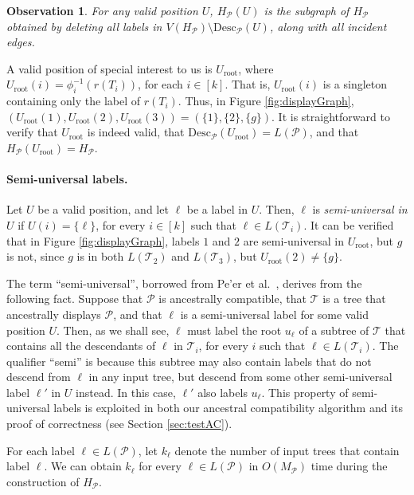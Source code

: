\documentclass[11pt]{article}
\newcommand{\MP}{\ensuremath{M_\P}} \newcommand{\TG}{\ensuremath{\Gamma}} \newcommand{\incompatible}{\texttt{incompatible}}
\newcommand{\Uinit}{\ensuremath{U_\mathrm{root}}} \newcommand{\Ubef}{\ensuremath{U_\mathrm{bef}}} \newcommand{\Uaft}{\ensuremath{U_\mathrm{aft}}} \newcommand{\Urem}{\ensuremath{U_\mathrm{rem}}} \newcommand{\Yinit}{\ensuremath{Y_\mathrm{root}}} \newcommand{\Winit}{\ensuremath{W_\mathrm{root}}} \newcommand{\indeg}{\ensuremath{\mathrm{indegree}}} \newcommand{\Desc}{\ensuremath{\mathrm{Desc}}}
\newcommand{\DG}{\ensuremath{H_\P}} \newcommand{\GBNT}{\ensuremath{G_{\mathtt{BNT}}}}
\renewcommand{\P}{\ensuremath{\mathcal{P}}}
\newcommand{\T}{\ensuremath{\mathcal{T}}}
\newtheorem{observation}{Observation}
\theoremstyle{definition}
\begin{document}
\begin{observation}\label{obs:update1}
For any valid position $U$, $\DG(U)$ is the subgraph of $\DG$ obtained by deleting all labels in $V(\DG) \setminus \Desc_\P(U)$, along with all incident edges.
\end{observation}

A valid position of special interest to us is $\Uinit$, where 
$\Uinit(i) = \phi_i^{-1}(r(T_i))$, for each $i \in [k]$.  That is, $\Uinit(i)$ is a singleton containing only the label of $r(T_i)$.  Thus, in Figure \ref{fig:displayGraph}, $(\Uinit(1), \Uinit(2), \Uinit(3)) = (\{1\}, \{2\}, \{g\})$.
It is straightforward to verify that $\Uinit$ is indeed valid, that $\Desc_\P(\Uinit) = L(\P)$, and that $\DG(\Uinit) = \DG$.  

\vspace{-1.5\parsep}

\paragraph{Semi-universal labels.} Let $U$ be a valid position, and let $\ell$ be a label in $U$.  Then, $\ell$ is \emph{semi-universal in $U$} if  $U(i) = \{\ell\}$, for every $i \in [k]$ such that $\ell \in L(\T_i)$.
It can be verified that in Figure \ref{fig:displayGraph}, labels $1$ and $2$ are semi-universal in $\Uinit$, but $g$ is not, since $g$ is in both $L(\T_2)$ and $L(\T_3)$, but $\Uinit(2) \neq \{g\}$.  

The term ``semi-universal'', borrowed from Pe'er et al.\ \cite{PeerShamirSharan04}, derives from the following fact.
Suppose that $\P$ is ancestrally compatible, that $\T$ is a tree that ancestrally displays $\P$, and that $\ell$ is a semi-universal label for some valid position $U$.  Then, as we shall see, $\ell$ must label the root $u_\ell$ of a subtree of $\T$ that contains all the descendants of $\ell$ in $\T_i$, for every $i$ such that $\ell \in L(\T_i)$.  The qualifier ``semi'' is because this subtree may also contain labels that do not descend from $\ell$ in any input tree, but descend from some other semi-universal label $\ell'$ in $U$ instead. In this case, $\ell'$ also labels $u_\ell$.  This property of semi-universal labels is exploited in both our ancestral compatibility algorithm and its proof of correctness (see Section \ref{sec:testAC}).

For each label $\ell \in L(\P)$, let $k_\ell$ denote the number of input trees that contain label $\ell$.  We can obtain $k_\ell$ for every $\ell \in L(\P)$ in $O(\MP)$ time during the construction of $\DG$.   
\end{document}
